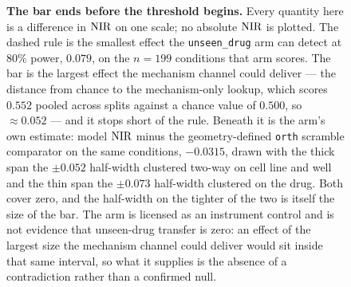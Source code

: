 \begin{figure}[htbp]
\caption[The detection floor sits above the largest plausible
effect]{\textbf{The bar ends before the threshold begins.} Every quantity
here is a difference in $\textrm{NIR}$ on one scale; no absolute $\textrm{NIR}$ is plotted.
The dashed rule is the smallest effect the \texttt{unseen\_drug} arm can
detect at $80\%$ power, $0.079$, on the $n = \num{199}$ conditions that arm
scores. The bar is the largest effect the mechanism channel could deliver ---
the distance from chance to the mechanism-only lookup, which scores $0.552$
pooled across splits against a chance value of $0.500$, so $\approx 0.052$ ---
and it stops short of the rule. Beneath it is the arm's own estimate: model
$\textrm{NIR}$ minus the geometry-defined \texttt{orth} scramble comparator on the
same conditions, $-0.0315$, drawn with the thick span the $\pm 0.052$
half-width clustered two-way on cell line and well and the thin span the
$\pm 0.073$ half-width clustered on the drug. Both cover zero, and the
half-width on the tighter of the two is itself the size of the bar. The arm
is licensed as an instrument control and is not evidence that unseen-drug
transfer is zero: an effect of the largest size the mechanism channel could
deliver would sit inside that same interval, so what it supplies is the
absence of a contradiction rather than a confirmed null.}
\label{fig:power}
\end{figure}
